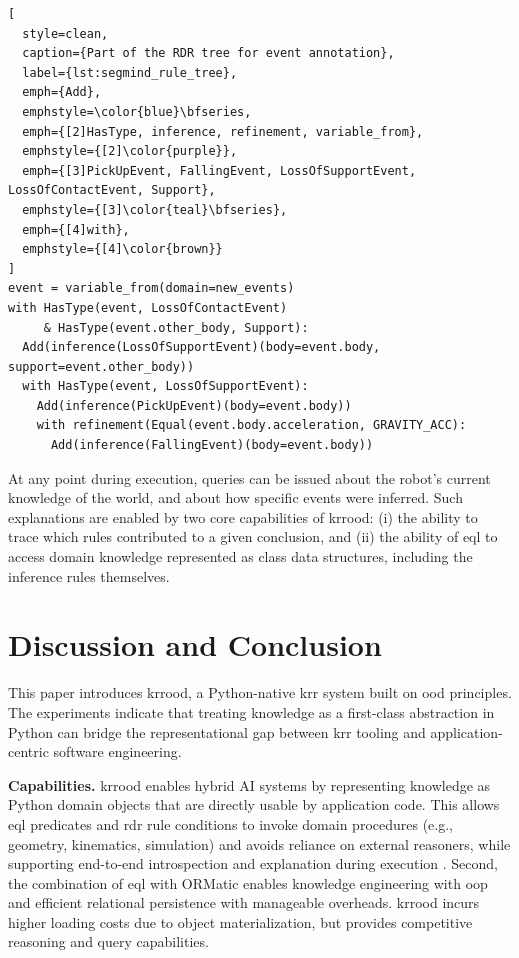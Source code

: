 \documentclass[a4paper,fleqn]{cas-sc}
\begin{document}
\begin{lstlisting}[
  style=clean,
  caption={Part of the RDR tree for event annotation},
  label={lst:segmind_rule_tree},
  emph={Add},
  emphstyle=\color{blue}\bfseries,
  emph={[2]HasType, inference, refinement, variable_from},
  emphstyle={[2]\color{purple}},
  emph={[3]PickUpEvent, FallingEvent, LossOfSupportEvent, LossOfContactEvent, Support},
  emphstyle={[3]\color{teal}\bfseries},
  emph={[4]with},
  emphstyle={[4]\color{brown}}
]
event = variable_from(domain=new_events)
with HasType(event, LossOfContactEvent)
     & HasType(event.other_body, Support):
  Add(inference(LossOfSupportEvent)(body=event.body, support=event.other_body))
  with HasType(event, LossOfSupportEvent):
    Add(inference(PickUpEvent)(body=event.body))
    with refinement(Equal(event.body.acceleration, GRAVITY_ACC):
      Add(inference(FallingEvent)(body=event.body))
\end{lstlisting}

At any point during execution, queries can be issued about the robot's current knowledge of the world, and about how specific events were inferred. Such explanations are enabled by two core capabilities of \ac{krrood}: (i) the ability to trace which rules contributed to a given conclusion, and (ii) the ability of \ac{eql} to access domain knowledge represented as class data structures, including the inference rules themselves.

\section{Discussion and Conclusion}
\label{sec:discussion_conclusion}

This paper introduces \ac{krrood}, a Python-native \ac{krr} system built on \ac{ood} principles. The experiments indicate that treating knowledge as a first-class abstraction in Python can bridge the representational gap between \ac{krr} tooling and application-centric software engineering.

\textbf{Capabilities.}
\ac{krrood} enables hybrid AI systems by representing knowledge as Python domain objects that are directly usable by application code. This allows \ac{eql} predicates and \ac{rdr} rule conditions to invoke domain procedures (e.g., geometry, kinematics, simulation) and avoids reliance on external reasoners, while supporting end-to-end introspection and explanation during execution \citep{beetz2025robot,mania2024open,alt2023knowledge,stelter2022open}. Second, the combination of \ac{eql} with ORMatic enables knowledge engineering with \ac{oop} and efficient relational persistence with manageable overheads. \ac{krrood} incurs higher loading costs due to object materialization, but provides competitive reasoning and query capabilities.
\end{document}
